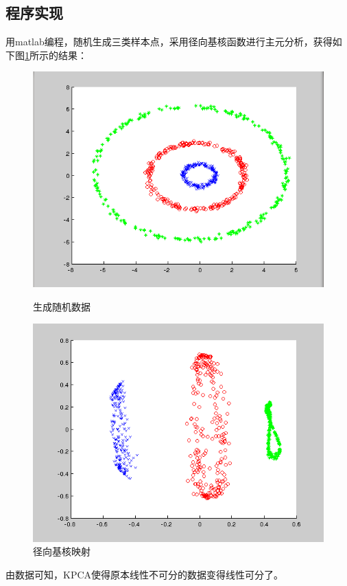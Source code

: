 \documentclass[12pt,a4paper,CJK]{beamer}
\begin{document}
\begin{CJK*}{UTF8}{gkai}
\subsection{程序实现}
\begin{frame}{\subsecname}
用matlab编程，随机生成三类样本点，采用径向基核函数进行主元分析，获得如下图\ref{kpca}所示的结果：
\begin{figure}[!htbp]
  \begin{minipage}[t]{0.48\linewidth}
    \centering
    \includegraphics[width=\textwidth]{figs/kpca_pre.png}
    \caption{生成随机数据\label{kpca_pre}}
  \end{minipage}
  \hfill
  \begin{minipage}[t]{0.48\linewidth}
    \centering
    \includegraphics[width=\textwidth]{figs/kpca_deal.png}
    \caption{径向基核映射\label{kpca_deal}}
  \end{minipage}
  \label{kpca}
\end{figure}
由数据可知，KPCA使得原本线性不可分的数据变得线性可分了。


\end{frame}
\end{CJK*}
\end{document}

